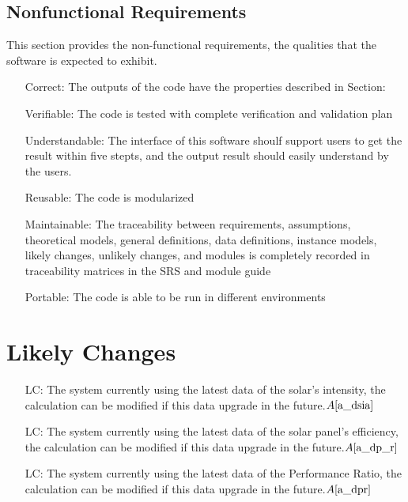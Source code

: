 \documentclass[12pt]{article}
\newcommand{\aref}[1]{A\ref{#1}}
\newcounter{lcnum} %
\begin{document}
\subsection{Nonfunctional Requirements}

This section provides the non-functional requirements, the qualities that the software is
expected to exhibit.

\noindent\begin{itemize}
\item[ ]Correct: The outputs of the code have the properties described in Section: 
\item[ ]Verifiable: The code is tested with complete verification and validation plan
\item[ ]Understandable: The interface of this software shoulf support users to get the result within five
stepts, and the output result should easily understand by the users.
\item[ ]Reusable: The code is modularized
\item[ ]Maintainable: The traceability between requirements, assumptions, theoretical models, general definitions, data definitions, instance models, likely changes, unlikely changes, and modules
is completely recorded in traceability matrices in the SRS and module guide
\item[ ]Portable: The code is able to be run in different environments
\end{itemize}

\section{Likely Changes}    

\noindent \begin{itemize}

\item[LC\refstepcounter{lcnum}\thelcnum\label{LC_SI}:] The system currently using the latest data of the solar's intensity, the calculation can be modified if this data upgrade in the future.$\aref{a_dsia}$

\item[LC\refstepcounter{lcnum}\thelcnum\label{LC_P}:] The system currently using the latest data of the solar panel's efficiency, the calculation can be modified if this data upgrade in the future.$\aref{a_dp_r}$

\item[LC\refstepcounter{lcnum}\thelcnum\label{LC_Pr}:] The system currently using the latest data of the Performance Ratio, the calculation can be modified if this data upgrade in the future.$\aref{a_dpr}$

\end{itemize}
\end{document}
